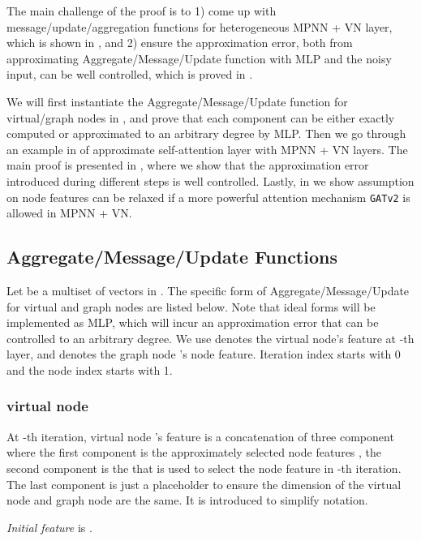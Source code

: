 \documentclass[nohyperref]{article}
\theoremstyle{plain}
\theoremstyle{definition}
\theoremstyle{remark}
\newcommand{\gatii}{\texttt{GATv2}\xspace}
\begin{document}
The main challenge of the proof is to 1) come up with message/update/aggregation functions for heterogeneous MPNN + VN layer, which is shown in ,
and 2) ensure the approximation error, both from approximating Aggregate/Message/Update function with MLP and the noisy input, can be well controlled, which is proved in .


We will first instantiate the Aggregate/Message/Update function for virtual/graph nodes in , and prove that each component can be either exactly computed or approximated to an arbitrary degree by MLP. Then we go through an example in  of approximate self-attention layer  with  MPNN + VN layers. The main proof is presented in , where we show that the approximation error introduced during different steps is well controlled. Lastly, in  we show assumption on node features can be relaxed if a more powerful attention mechanism \gatii \citep{brody2021attentive} is allowed in MPNN + VN.  

\subsection{Aggregate/Message/Update
Functions}
\label{subsec-mpnn-form}


Let  be a multiset of vectors in . 
The specific form of Aggregate/Message/Update for virtual and graph nodes are listed below. Note that ideal forms will be implemented as MLP, which will incur an approximation error that can be controlled to an arbitrary degree. We use  denotes the virtual node's feature at -th layer, and  denotes the graph node 's node feature. Iteration index  starts with 0 and the node index starts with 1. 

\subsubsection{virtual node}\label{subsubsec-vn}
At -th iteration, virtual node 's feature  is a concatenation of three component  where the first component is the approximately selected node features , the second component is the  that is used to select the node feature in -th iteration. The last component is just a placeholder to ensure the dimension of the virtual node and graph node are the same. It is introduced to simplify notation.  



\emph{Initial feature} is . 
\end{document}
